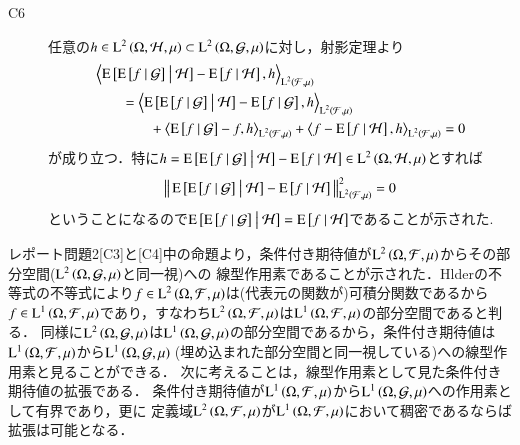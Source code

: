\begin{prf}
\begin{description}
			\item[C6] 任意の$h \in \operatorname{L}^{2} \left(\Omega, \mathcal{H},\mu\right) \subset \operatorname{L}^{2} \left(\Omega, \mathcal{G},\mu\right)$に対し，射影定理より
				\begin{align}
					&\inprod<\cexp{\cexp{f}{\mathcal{G}}}{\mathcal{H}} - \cexp{f}{\mathcal{H}}, h>_{\Lp{2}{\mathcal{F},\mu}} \\
					&\qquad = \inprod<\cexp{\cexp{f}{\mathcal{G}}}{\mathcal{H}} - \cexp{f}{\mathcal{G}}, h>_{\Lp{2}{\mathcal{F},\mu}} \\
						&\qquad \qquad + \inprod<\cexp{f}{\mathcal{G}} - f, h>_{\Lp{2}{\mathcal{F},\mu}} + \inprod<f - \cexp{f}{\mathcal{H}}, h>_{\Lp{2}{\mathcal{F},\mu}}
					= 0
				\end{align}
				が成り立つ．特に$h = \operatorname{E} \left[ \operatorname{E} \left[ f \ \middle|\ \mathcal{G} \right] \ \middle|\ \mathcal{H} \right] - \operatorname{E} \left[ f \ \middle|\ \mathcal{H} \right] \in \operatorname{L}^{2} \left(\Omega, \mathcal{H},\mu\right)$とすれば
				\begin{align}
					\left\|\, \operatorname{E} \left[ \operatorname{E} \left[ f \ \middle|\ \mathcal{G} \right] \ \middle|\ \mathcal{H} \right] - \operatorname{E} \left[ f \ \middle|\ \mathcal{H} \right]\, \right\|_{\operatorname{L}^{2} \left(\mathcal{F},\mu\right)}^2 = 0
				\end{align}
				ということになるので$\operatorname{E} \left[ \operatorname{E} \left[ f \ \middle|\ \mathcal{G} \right] \ \middle|\ \mathcal{H} \right] = \operatorname{E} \left[ f \ \middle|\ \mathcal{H} \right]$であることが示された.
		\end{description}
		\QED
	\end{prf}
	
	レポート問題2[C3]と[C4]中の命題より，条件付き期待値が$\operatorname{L}^{2} \left(\Omega,\mathcal{F},\mu\right)$からその部分空間($\operatorname{L}^{2} \left(\Omega,\mathcal{G},\mu\right)$と同一視)への
	線型作用素であることが示された．Hlderの不等式の不等式により$f \in \operatorname{L}^{2} \left(\Omega,\mathcal{F},\mu\right)$は(代表元の関数が)可積分関数であるから
	$f \in \operatorname{L}^{1} \left(\Omega,\mathcal{F},\mu\right)$であり，すなわち$\operatorname{L}^{2} \left(\Omega,\mathcal{F},\mu\right)$は$\operatorname{L}^{1} \left(\Omega,\mathcal{F},\mu\right)$の部分空間であると判る．
	同様に$\operatorname{L}^{2} \left(\Omega,\mathcal{G},\mu\right)$は$\operatorname{L}^{1} \left(\Omega,\mathcal{G},\mu\right)$の部分空間であるから，条件付き期待値は
	$\operatorname{L}^{1} \left(\Omega,\mathcal{F},\mu\right)$から$\Lp{1}{\Omega,\mathcal{G},\mu}\ $(埋め込まれた部分空間と同一視している)への線型作用素と見ることができる．
	次に考えることは，線型作用素として見た条件付き期待値の拡張である．
	条件付き期待値が$\operatorname{L}^{1} \left(\Omega,\mathcal{F},\mu\right)$から$\operatorname{L}^{1} \left(\Omega,\mathcal{G},\mu\right)$への作用素として有界であり，更に
	定義域$\operatorname{L}^{2} \left(\Omega,\mathcal{F},\mu\right)$が$\operatorname{L}^{1} \left(\Omega,\mathcal{F},\mu\right)$において稠密であるならば拡張は可能となる．
	
